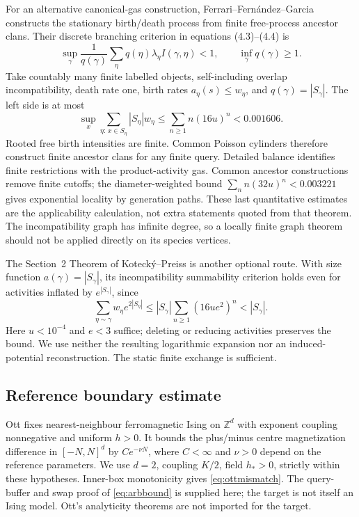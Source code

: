 \documentclass[11pt,reqno]{amsart}
\numberwithin{equation}{section}
\theoremstyle{definition}
\theoremstyle{remark}
\newcommand{\Z}{\mathbb Z}
\begin{document}
For an alternative canonical-gas construction, Ferrari--Fern\'andez--Garcia \cite[Theorem~1(ii)]{FerrariFernandezGarcia2002} constructs the stationary birth/death process from finite free-process ancestor clans. Their discrete branching criterion in equations (4.3)--(4.4) is
\[
 \sup_\gamma\frac1{q(\gamma)}\sum_\eta q(\eta)\lambda_\eta I(\gamma,\eta)<1,
 \qquad \inf_\gamma q(\gamma)\geq1.
\]
Take countably many finite labelled objects, self-including overlap incompatibility, death rate one, birth rates $a_\eta(s)\leq w_\eta$, and $q(\gamma)=|S_\gamma|$. The left side is at most
\[
 \sup_x\sum_{\eta:\,x\in S_\eta}|S_\eta|w_\eta
 \leq\sum_{n\geq1}n(16u)^n<0.001606.
\]
Rooted free birth intensities are finite. Common Poisson cylinders therefore construct finite ancestor clans for any finite query. Detailed balance identifies finite restrictions with the product-activity gas. Common ancestor constructions remove finite cutoffs; the diameter-weighted bound $\sum_n n(32u)^n<0.003221$ gives exponential locality by generation paths. These last quantitative estimates are the applicability calculation, not extra statements quoted from that theorem. The incompatibility graph has infinite degree, so a locally finite graph theorem should not be applied directly on its species vertices.

The Section~2 Theorem of Koteck\'y--Preiss \cite{KoteckyPreiss1986} is another optional route. With size function $a(\gamma)=|S_\gamma|$, its incompatibility summability criterion holds even for activities inflated by $e^{|S_\gamma|}$, since
\[
 \sum_{\eta\sim\gamma}w_\eta e^{2|S_\eta|}
 \leq |S_\gamma|\sum_{n\geq1}(16ue^2)^n<|S_\gamma|.
\]
Here $u<10^{-4}$ and $e<3$ suffice; deleting or reducing activities preserves the bound. We use neither the resulting logarithmic expansion nor an induced-potential reconstruction. The static finite exchange is sufficient.

\subsection{Reference boundary estimate}
Ott \cite[Theorem~6.1, arXiv:1905.12928v2]{Ott2020} fixes nearest-neighbour ferromagnetic Ising on $\Z^d$ with exponent coupling nonnegative and uniform $h>0$. It bounds the plus/minus centre magnetization difference in $[-N,N]^d$ by $Ce^{-\nu N}$, where $C<\infty$ and $\nu>0$ depend on the reference parameters. We use $d=2$, coupling $K/2$, field $h_*>0$, strictly within these hypotheses. Inner-box monotonicity gives \eqref{eq:ottmismatch}. The query-buffer and swap proof of \eqref{eq:arbbound} is supplied here; the target is not itself an Ising model. Ott's analyticity theorems are not imported for the target.
\end{document}
